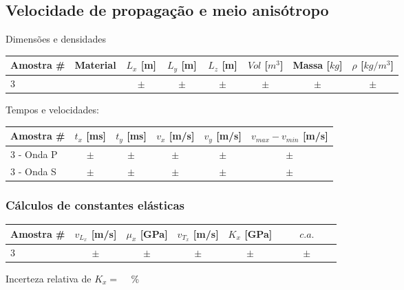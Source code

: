 \documentclass[a4paper,12pt]{article}  %
\begin{document}
\subsection{\sf Velocidade de propagação e meio anisótropo}%

Dimensões e densidades
\begin{center}
	\begin{tabular}{|l|c|c|c|c|c|c|c|}
	\hline
	 Amostra \# & Material  &  $L_x$ [m]  &   $L_y$ [m]  &  $L_z$ [m]  & $Vol$ [$m^3$]  & Massa [$kg$] & $\rho$ [$kg/m^3$] \\
	\hline \hline
	  3   &   & $ \quad \pm \quad $ &  $ \quad \pm \quad $ & $ \quad \pm \quad $ & $ \quad \pm \quad $ & $ \quad \pm \quad $ & $ \quad \pm \quad $ \\ \hline
	\end{tabular}
\end{center}

Tempos e velocidades:
\begin{center}
	\begin{tabular}{|l|c|c|c|c|c|}
	\hline
	  Amostra \# &   $t_x$ [ms]  &   $t_y$ [ms]  &  $v_x$ [m/s] & $v_y$ [m/s]  & 
	   $v_{max}-v_{min}$ [m/s]	\\
	\hline \hline
	 3 - Onda P   & $ \quad \pm \quad $ &  $ \quad \pm \quad $ & $ \quad \pm \quad $ & $\quad \pm \quad $ & $ \quad \pm \quad $ \\ \hline
	 3 - Onda S   & $ \quad \pm \quad $ &  $ \quad \pm \quad $ & $ \quad \pm \quad $ & $\quad \pm \quad $ & $ \quad \pm \quad $ \\ \hline
 	\end{tabular}
\end{center}

\subsubsection{\sf Cálculos de constantes elásticas}%

\begin{center}
	\begin{tabular}{|l|c|c|c|c|c|}
	\hline
	  Amostra \# &   $v_{L_x}$ [m/s]  &   $\mu_x$ [GPa]  &  $v_{T_x}$ [m/s] & $K_x$ [GPa] & $c.a.$   	\\
	\hline \hline
	  3   & $ \quad \pm \quad $ &  $ \quad \pm \quad $ & $ \quad \pm \quad $ & $ \quad \pm \quad $ & $ \qquad \pm \qquad $ \\ \hline
 	\end{tabular}
\end{center}
Incerteza relativa de $K_x=$ ~\underline{\makebox[1cm][r]{~}} \%
\end{document}
